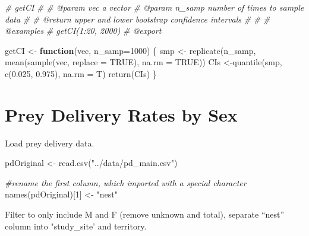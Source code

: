 \documentclass[
]{article}
\newenvironment{Shaded}{\begin{snugshade}}{\end{snugshade}}
\newcommand{\AttributeTok}[1]{\textcolor[rgb]{0.77,0.63,0.00}{#1}}
\newcommand{\CommentTok}[1]{\textcolor[rgb]{0.56,0.35,0.01}{\textit{#1}}}
\newcommand{\ConstantTok}[1]{\textcolor[rgb]{0.00,0.00,0.00}{#1}}
\newcommand{\ControlFlowTok}[1]{\textcolor[rgb]{0.13,0.29,0.53}{\textbf{#1}}}
\newcommand{\DecValTok}[1]{\textcolor[rgb]{0.00,0.00,0.81}{#1}}
\newcommand{\FloatTok}[1]{\textcolor[rgb]{0.00,0.00,0.81}{#1}}
\newcommand{\FunctionTok}[1]{\textcolor[rgb]{0.00,0.00,0.00}{#1}}
\newcommand{\NormalTok}[1]{#1}
\newcommand{\OtherTok}[1]{\textcolor[rgb]{0.56,0.35,0.01}{#1}}
\newcommand{\StringTok}[1]{\textcolor[rgb]{0.31,0.60,0.02}{#1}}
\begin{document}
\begin{Shaded}
\begin{Highlighting}[]
\CommentTok{\#\textquotesingle{} getCI}
\CommentTok{\#\textquotesingle{} }
\CommentTok{\#\textquotesingle{} @param vec a vector}
\CommentTok{\#\textquotesingle{} @param n\_samp number of times to sample data}
\CommentTok{\#\textquotesingle{}}
\CommentTok{\#\textquotesingle{} @return upper and lower bootstrap confidence intervals}
\CommentTok{\#\textquotesingle{} }
\CommentTok{\#\textquotesingle{}}
\CommentTok{\#\textquotesingle{} @examples}
\CommentTok{\#\textquotesingle{}    getCI(1:20, 2000)}
\CommentTok{\#\textquotesingle{} @export}

\NormalTok{getCI }\OtherTok{\textless{}{-}} \ControlFlowTok{function}\NormalTok{(vec, }\AttributeTok{n\_samp=}\DecValTok{1000}\NormalTok{) \{}
\NormalTok{  smp }\OtherTok{\textless{}{-}} \FunctionTok{replicate}\NormalTok{(n\_samp, }\FunctionTok{mean}\NormalTok{(}\FunctionTok{sample}\NormalTok{(vec, }\AttributeTok{replace =} \ConstantTok{TRUE}\NormalTok{), }\AttributeTok{na.rm =} \ConstantTok{TRUE}\NormalTok{))}
\NormalTok{  CIs }\OtherTok{\textless{}{-}}\FunctionTok{quantile}\NormalTok{(smp, }\FunctionTok{c}\NormalTok{(}\FloatTok{0.025}\NormalTok{, }\FloatTok{0.975}\NormalTok{), }\AttributeTok{na.rm =}\NormalTok{ T)}
  \FunctionTok{return}\NormalTok{(CIs)}
\NormalTok{\}}
\end{Highlighting}
\end{Shaded}

\hypertarget{prey-delivery-rates-by-sex}{%
\section{Prey Delivery Rates by Sex}\label{prey-delivery-rates-by-sex}}

Load prey delivery data.

\begin{Shaded}
\begin{Highlighting}[]
\NormalTok{pdOriginal }\OtherTok{\textless{}{-}} \FunctionTok{read.csv}\NormalTok{(}\StringTok{"../data/pd\_main.csv"}\NormalTok{)}


\CommentTok{\#rename the first column, which imported with a special character}
\FunctionTok{names}\NormalTok{(pdOriginal)[}\DecValTok{1}\NormalTok{] }\OtherTok{\textless{}{-}} \StringTok{"nest"}
\end{Highlighting}
\end{Shaded}

Filter to only include M and F (remove unknown and total), separate
``nest'' column into "study\_site' and territory.
\end{document}
